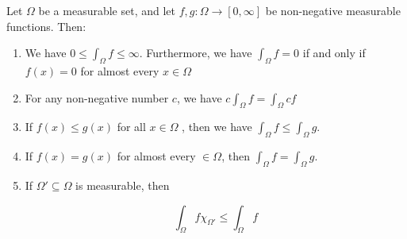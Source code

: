 \begin{thm}
    Let $\Omega$ be a measurable set, and let $f,g: \Omega \to [0,\infty]$ be non-negative measurable functions.
    Then:

    \begin{enumerate}
        \item We have $0 \le \int_{\Omega}f \le \infty$. Furthermore, we have $\int_{\Omega} f = 0$ if and only if $f(x) = 0$
for almost every $x \in \Omega$

        \item For any non-negative number $c$, we have $c \int_{\Omega}f  = \int_{\Omega}cf$

        \item  If $f (x) \le g(x)$ for all $x \in \Omega$ , then we have $\int_{\Omega} f \le \int_{\Omega} g$.

        \item If $f (x)= g(x)$ for almost every $\in \Omega$, then $\int_{\Omega}f = \int_{\Omega} g$.

        \item If $\Omega' \subseteq \Omega$ is measurable, then

        \[
            \int_{\Omega} f \chi_{\Omega'} \le \int_{\Omega} f
        \]
    \end{enumerate}
\end{thm}

